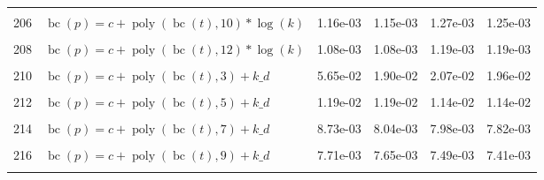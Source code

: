\documentclass[12pt,a4paper]{article}
\DeclareMathOperator{\bc}{bc}
\DeclareMathOperator{\poly}{poly}
\begin{document}
\begin{longtable}[t]{ll>{\raggedleft\arraybackslash}p{2cm}>{\raggedleft\arraybackslash}p{2cm}>{\raggedleft\arraybackslash}p{2cm}>{\raggedleft\arraybackslash}p{2cm}}
\cellcolor{gray!6}{205} & \cellcolor{gray!6}{$\bc(p) = c + \poly\left( \bc(t), 9 \right) * \log(k)$} & \cellcolor{gray!6}{2.13e-03} & \cellcolor{gray!6}{2.00e-03} & \cellcolor{gray!6}{2.31e-03} & \cellcolor{gray!6}{2.16e-03}\\
206 & $\bc(p) = c + \poly\left( \bc(t), 10 \right) * \log(k)$ & 1.16e-03 & 1.15e-03 & 1.27e-03 & 1.25e-03\\
\cellcolor{gray!6}{207} & \cellcolor{gray!6}{$\bc(p) = c + \poly\left( \bc(t), 11 \right) * \log(k)$} & \cellcolor{gray!6}{1.18e-03} & \cellcolor{gray!6}{1.15e-03} & \cellcolor{gray!6}{1.29e-03} & \cellcolor{gray!6}{1.27e-03}\\
208 & $\bc(p) = c + \poly\left( \bc(t), 12 \right) * \log(k)$ & 1.08e-03 & 1.08e-03 & 1.19e-03 & 1.19e-03\\
\cellcolor{gray!6}{209} & \cellcolor{gray!6}{$\bc(p) = c + \poly\left( \bc(t), 13 \right) * \log(k)$} & \cellcolor{gray!6}{1.08e-03} & \cellcolor{gray!6}{1.08e-03} & \cellcolor{gray!6}{1.19e-03} & \cellcolor{gray!6}{1.19e-03}\\
210 & $\bc(p) = c + \poly\left( \bc(t), 3 \right) + k\_d$ & 5.65e-02 & 1.90e-02 & 2.07e-02 & 1.96e-02\\
\cellcolor{gray!6}{211} & \cellcolor{gray!6}{$\bc(p) = c + \poly\left( \bc(t), 4 \right) + k\_d$} & \cellcolor{gray!6}{2.40e-02} & \cellcolor{gray!6}{2.26e-02} & \cellcolor{gray!6}{2.49e-02} & \cellcolor{gray!6}{2.42e-02}\\
212 & $\bc(p) = c + \poly\left( \bc(t), 5 \right) + k\_d$ & 1.19e-02 & 1.19e-02 & 1.14e-02 & 1.14e-02\\
\cellcolor{gray!6}{213} & \cellcolor{gray!6}{$\bc(p) = c + \poly\left( \bc(t), 6 \right) + k\_d$} & \cellcolor{gray!6}{1.03e-02} & \cellcolor{gray!6}{9.32e-03} & \cellcolor{gray!6}{1.05e-02} & \cellcolor{gray!6}{9.33e-03}\\
214 & $\bc(p) = c + \poly\left( \bc(t), 7 \right) + k\_d$ & 8.73e-03 & 8.04e-03 & 7.98e-03 & 7.82e-03\\
\cellcolor{gray!6}{215} & \cellcolor{gray!6}{$\bc(p) = c + \poly\left( \bc(t), 8 \right) + k\_d$} & \cellcolor{gray!6}{7.64e-03} & \cellcolor{gray!6}{7.61e-03} & \cellcolor{gray!6}{7.39e-03} & \cellcolor{gray!6}{7.35e-03}\\
216 & $\bc(p) = c + \poly\left( \bc(t), 9 \right) + k\_d$ & 7.71e-03 & 7.65e-03 & 7.49e-03 & 7.41e-03\\
\cellcolor{gray!6}{217} & \cellcolor{gray!6}{$\bc(p) = c + \poly\left( \bc(t), 10 \right) + k\_d$} & \cellcolor{gray!6}{7.46e-03} & \cellcolor{gray!6}{7.45e-03} & \cellcolor{gray!6}{7.19e-03} & \cellcolor{gray!6}{7.17e-03}\\

\end{longtable}
\end{document}
